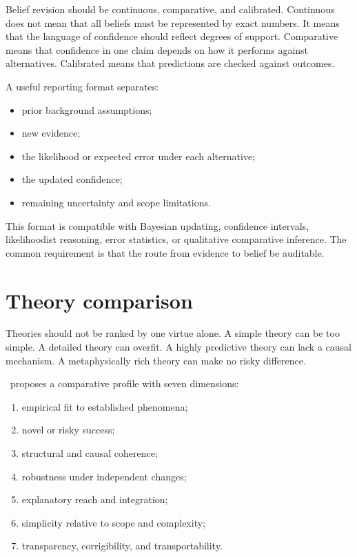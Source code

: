 Belief revision should be continuous, comparative, and calibrated. Continuous
does not mean that all beliefs must be represented by exact numbers. It means
that the language of confidence should reflect degrees of support. Comparative
means that confidence in one claim depends on how it performs against
alternatives. Calibrated means that predictions are checked against outcomes.

A useful reporting format separates:

\begin{itemize}
\item prior background assumptions;
\item new evidence;
\item the likelihood or expected error under each alternative;
\item the updated confidence;
\item remaining uncertainty and scope limitations.
\end{itemize}

This format is compatible with Bayesian updating, confidence intervals,
likelihoodist reasoning, error statistics, or qualitative comparative
inference. The common requirement is that the route from evidence to belief be
auditable.

\section{Theory comparison}

Theories should not be ranked by one virtue alone. A simple theory can be too
simple. A detailed theory can overfit. A highly predictive theory can lack a
causal mechanism. A metaphysically rich theory can make no risky difference.

\RCR\ proposes a comparative profile with seven dimensions:

\begin{enumerate}
\item empirical fit to established phenomena;
\item novel or risky success;
\item structural and causal coherence;
\item robustness under independent changes;
\item explanatory reach and integration;
\item simplicity relative to scope and complexity;
\item transparency, corrigibility, and transportability.
\end{enumerate}

